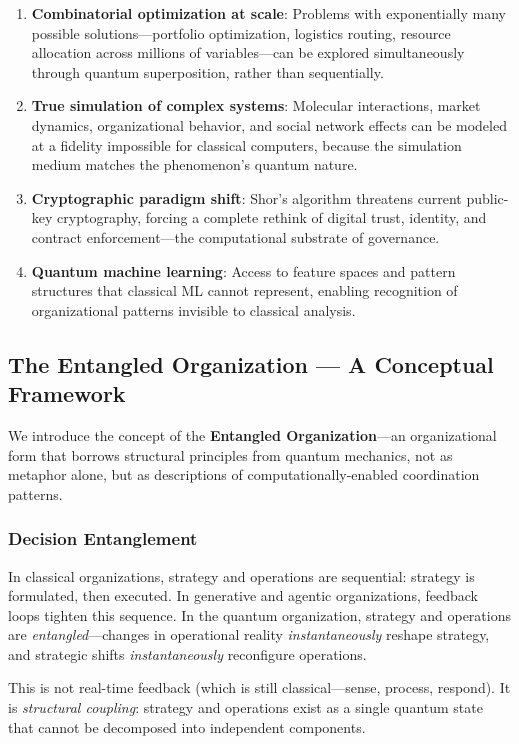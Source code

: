 \documentclass[11pt,a4paper,twocolumn]{article}
\begin{document}
\begin{enumerate}[leftmargin=1.5em]
  \item \textbf{Combinatorial optimization at scale}: Problems with exponentially many possible solutions---portfolio optimization, logistics routing, resource allocation across millions of variables---can be explored simultaneously through quantum superposition, rather than sequentially.
  \item \textbf{True simulation of complex systems}: Molecular interactions, market dynamics, organizational behavior, and social network effects can be modeled at a fidelity impossible for classical computers, because the simulation medium matches the phenomenon's quantum nature.
  \item \textbf{Cryptographic paradigm shift}: Shor's algorithm \cite{shor1994} threatens current public-key cryptography, forcing a complete rethink of digital trust, identity, and contract enforcement---the computational substrate of governance.
  \item \textbf{Quantum machine learning}: Access to feature spaces and pattern structures that classical ML cannot represent, enabling recognition of organizational patterns invisible to classical analysis.
\end{enumerate}

\subsection{The Entangled Organization --- A Conceptual Framework}

We introduce the concept of the \textbf{Entangled Organization}---an organizational form that borrows structural principles from quantum mechanics, not as metaphor alone, but as descriptions of computationally-enabled coordination patterns.

\subsubsection{Decision Entanglement}
In classical organizations, strategy and operations are sequential: strategy is formulated, then executed. In generative and agentic organizations, feedback loops tighten this sequence. In the quantum organization, strategy and operations are \textit{entangled}---changes in operational reality \textit{instantaneously} reshape strategy, and strategic shifts \textit{instantaneously} reconfigure operations.

This is not real-time feedback (which is still classical---sense, process, respond). It is \textit{structural coupling}: strategy and operations exist as a single quantum state that cannot be decomposed into independent components.
\end{document}
